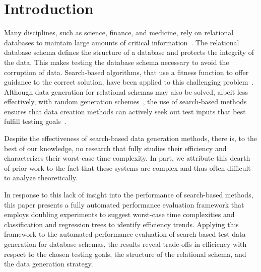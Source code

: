 
\vspace*{-.25in}
\section{Introduction}
\vspace*{-.05in}



Many disciplines, such as science, finance, and medicine, rely on relational databases to maintain large amounts of
critical information~\cite{kapfhammer2007}. The relational database schema defines the structure of a database and
protects the integrity of the data. This makes testing the database schema necessary to avoid the corruption of data.
Search-based algorithms, that use a fitness function to offer guidance to the correct solution, have been applied to
this challenging problem~\cite{Kapfhammer2013}. Although data generation for relational schemas may also be solved,
albeit less effectively, with random generation schemes~\cite{McMinn2015}, the use of search-based methods ensures that
data creation methods can actively seek out test inputs that best fulfill testing goals~\cite{McMinn2004a}.



Despite the effectiveness of search-based data generation methods, there is, to the best of our knowledge, no research
that fully studies their efficiency and characterizes their worst-case time complexity. In part, we attribute this
dearth of prior work to the fact that these systems are complex and thus often difficult to analyze theoretically.

In response to this lack of insight into the performance of search-based methods, this paper presents a fully automated
performance evaluation framework that employs doubling experiments to suggest worst-case time complexities and
classification and regression trees to identify efficiency trends. Applying this framework to the automated performance
evaluation of search-based test data generation for database schemas, the results reveal trade-offs in efficiency with
respect to the chosen testing goals, the structure of the relational schema, and the data generation strategy.

